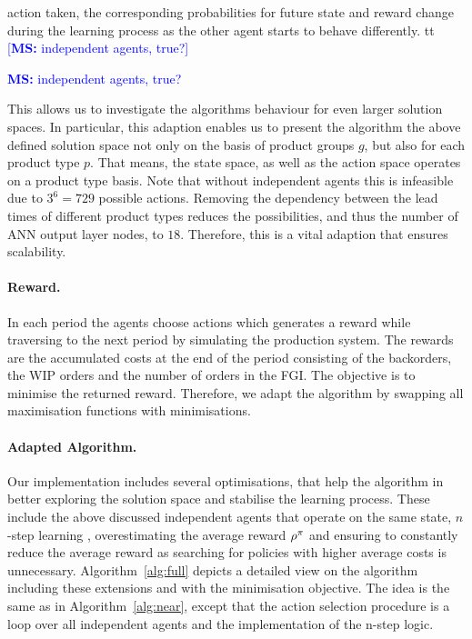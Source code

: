 \documentclass[envcountsame]{llncs}
\newcommand\MS[2][r]{\ifx t#1 \textcolor{blue}{[\textbf{MS:} #2]}
  \else \begin{center}\textcolor{blue}{\textbf{MS:} #2} \end{center} \fi}
\begin{document}
action taken, the corresponding probabilities for future state and reward change during the learning
process as the other agent starts to behave differently.
%
\MS[t]{independent agents, true?}This allows us to investigate the algorithms behaviour for even
larger solution spaces. In particular, this adaption enables us to present the algorithm the above
defined solution space not only on the basis of product groups \(g\), but also for each product type
\(p\). That means, the state space, as well as the action space operates on a product type basis.
Note that without independent agents this is infeasible due to \(3^{6} = 729\) possible actions.
Removing the dependency between the lead times of different product types reduces the possibilities,
and thus the number of ANN output layer nodes, to \(18\). Therefore, this is a vital adaption that
ensures scalability.




\paragraph*{Reward.}
In each period the agents choose actions which generates a reward while traversing to the next
period by simulating the production system. The rewards are the accumulated costs at the end of the
period consisting of the backorders, the WIP orders and the number of orders in the FGI\@. The
objective is to minimise the returned reward. Therefore, we adapt the algorithm by swapping all
maximisation functions with minimisations.

\paragraph*{Adapted Algorithm.}
Our implementation includes several optimisations, that help the algorithm in better exploring the
solution space and stabilise the learning process. These include the above discussed independent
agents that operate on the same state, \(n\)-step learning \citep{mnih2016asynchronous},
overestimating the average reward \(\rho^{\pi}\) and ensuring to constantly reduce the average
reward as searching for policies with higher average costs is unnecessary. Algorithm~\ref{alg:full}
depicts a detailed view on the algorithm including these extensions and with the minimisation
objective. The idea is the same as in Algorithm~\ref{alg:near}, except that the action selection
procedure is a loop over all independent agents and the implementation of the n-step logic.
\end{document}
